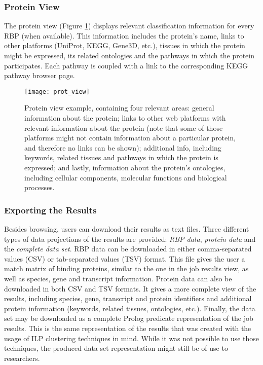 \subsubsection*{Protein View}

The protein view (Figure \ref{fig:prot_view}) displays relevant classification
information for every RBP (when available). This information includes the
protein's name, links to other platforms (UniProt, KEGG, Gene3D, etc.), tissues
in which the protein might be expressed, its related ontologies and the pathways
in which the protein participates. Each pathway is coupled with a link to the
corresponding KEGG pathway browser page.

\begin{figure}[!htb]
  \begin{center}
    \leavevmode
    \texttt{[image: prot\_view]}
    \caption[Protein view example]{
      Protein view example, containing four relevant areas: general information
      about the protein; links to other web platforms with relevant information
      about the protein (note that some of those platforms might not contain
      information about a particular protein, and therefore no links can be
      shown); additional info, including keywords, related tissues and pathways
      in which the protein is expressed; and lastly, information about the
      protein's ontologies, including cellular components, molecular functions
      and biological processes.
    }
    \label{fig:prot_view}
  \end{center}
\end{figure}

\subsubsection*{Exporting the Results}

Besides browsing, users can download their results as text files. Three
different types of data projections of the results are provided: \emph{RBP
data}, \emph{protein data} and the \emph{complete data set}. RBP data can be
downloaded in either comma-separated values (CSV) or tab-separated values (TSV)
format. This file gives the user a match matrix of binding proteins, similar to
the one in the job results view, as well as species, gene and transcript
information. Protein data can also be downloaded in both CSV and TSV formats. It
gives a more complete view of the results, including species, gene, transcript
and protein identifiers and additional protein information (keywords, related
tissues, ontologies, etc.). Finally, the data set may be downloaded as a
complete Prolog predicate representation of the job results. This is the same
representation of the results that was created with the usage of ILP clustering
techniques in mind. While it was not possible to use those techniques, the
produced data set representation might still be of use to researchers.

